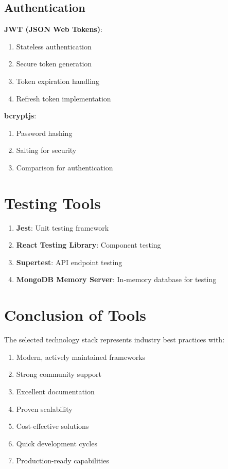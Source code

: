 \documentclass[12pt,a4paper]{report}
\begin{document}
\subsection{Authentication}

\textbf{JWT (JSON Web Tokens)}:
\begin{enumerate}[label=\roman*)]
    \item Stateless authentication
    \item Secure token generation
    \item Token expiration handling
    \item Refresh token implementation
\end{enumerate}

\textbf{bcryptjs}:
\begin{enumerate}[label=\roman*)]
    \item Password hashing
    \item Salting for security
    \item Comparison for authentication
\end{enumerate}

\section{Testing Tools}

\begin{enumerate}[label=\roman*)]
    \item \textbf{Jest}: Unit testing framework
    \item \textbf{React Testing Library}: Component testing
    \item \textbf{Supertest}: API endpoint testing
    \item \textbf{MongoDB Memory Server}: In-memory database for testing
\end{enumerate}

\section{Conclusion of Tools}

The selected technology stack represents industry best practices with:

\begin{enumerate}[label=\roman*)]
    \item Modern, actively maintained frameworks
    \item Strong community support
    \item Excellent documentation
    \item Proven scalability
    \item Cost-effective solutions
    \item Quick development cycles
    \item Production-ready capabilities
\end{enumerate}
\end{document}
